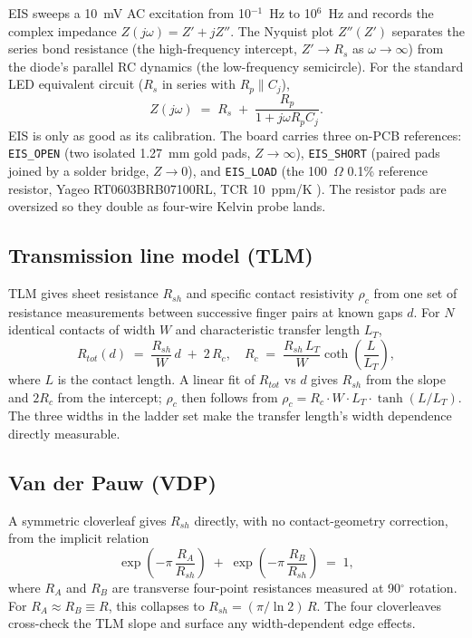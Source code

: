 \documentclass[conference]{IEEEtran}
\begin{document}
EIS sweeps a 10~mV AC excitation from 10$^{-1}$~Hz to 10$^{6}$~Hz and
records the complex impedance $Z(j\omega) = Z' + jZ''$. The Nyquist plot
$Z''(Z')$ separates the series bond resistance (the high-frequency
intercept, $Z' \rightarrow R_s$ as $\omega \rightarrow \infty$) from the
diode's parallel RC dynamics (the low-frequency semicircle). For the
standard LED equivalent circuit ($R_s$ in series with $R_p \parallel C_j$),
\begin{equation}
  Z(j\omega) \;=\; R_s \;+\; \frac{R_p}{1 + j\omega R_p C_j}.
  \label{eq:eis}
\end{equation}
EIS is only as good as its calibration. The board carries three on-PCB
references: \texttt{EIS\_OPEN} (two isolated 1.27~mm gold pads,
$Z \rightarrow \infty$), \texttt{EIS\_SHORT} (paired pads joined by a
solder bridge, $Z \rightarrow 0$), and \texttt{EIS\_LOAD} (the 100~$\Omega$
0.1\% reference resistor, Yageo RT0603BRB07100RL, TCR 10~ppm/K
\cite{yageo_rt0603}). The resistor
pads are oversized so they double as four-wire Kelvin probe lands.

\subsection{Transmission line model (TLM)}

TLM gives sheet resistance $R_{sh}$ and specific contact resistivity
$\rho_c$ from one set of resistance measurements between successive
finger pairs at known gaps $d$. For $N$ identical contacts of width $W$
and characteristic transfer length $L_T$,
\begin{equation}
  R_{tot}(d) \;=\; \frac{R_{sh}}{W}\,d \;+\; 2\,R_c,
  \quad
  R_c \;=\; \frac{R_{sh}\,L_T}{W}\coth\!\left(\frac{L}{L_T}\right),
  \label{eq:tlm}
\end{equation}
where $L$ is the contact length. A linear fit of $R_{tot}$ vs $d$ gives
$R_{sh}$ from the slope and $2 R_c$ from the intercept; $\rho_c$ then
follows from $\rho_c = R_c \cdot W \cdot L_T \cdot \tanh(L/L_T)$. The
three widths in the ladder set make the transfer length's width
dependence directly measurable.

\subsection{Van der Pauw (VDP)}

A symmetric cloverleaf gives $R_{sh}$ directly, with no contact-geometry
correction, from the implicit relation
\begin{equation}
  \exp\!\left(-\pi\,\frac{R_A}{R_{sh}}\right) \;+\;
  \exp\!\left(-\pi\,\frac{R_B}{R_{sh}}\right) \;=\; 1,
  \label{eq:vdp}
\end{equation}
where $R_A$ and $R_B$ are transverse four-point resistances measured
at 90$^\circ$ rotation. For $R_A \approx R_B \equiv R$, this collapses to
$R_{sh} = (\pi / \ln 2)\,R$. The four cloverleaves cross-check the TLM
slope and surface any width-dependent edge effects.
\end{document}
